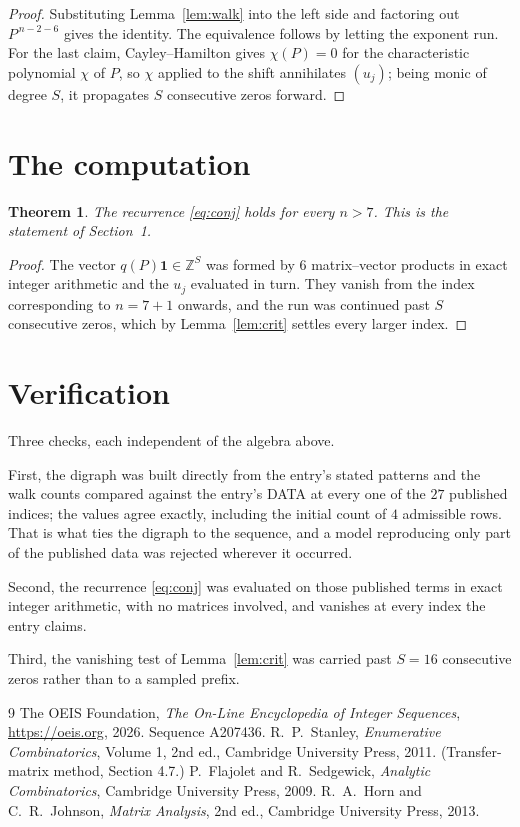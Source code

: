 \documentclass[11pt,a4paper]{article}
\theoremstyle{plain}
\newtheorem{theorem}{Theorem}
\theoremstyle{definition}
\begin{document}
\begin{proof}
Substituting Lemma~\ref{lem:walk} into the left side and factoring out
$P^{\,n-2-6}$ gives the identity. The equivalence follows by letting the exponent
run. For the last claim, Cayley--Hamilton gives $\chi(P)=0$ for the characteristic
polynomial $\chi$ of $P$, so $\chi$ applied to the shift annihilates $(u_j)$; being monic of
degree $S$, it propagates $S$ consecutive zeros forward.
\end{proof}

\section{The computation}

\begin{theorem}
The recurrence \eqref{eq:conj} holds for every $n>7$. This is the statement of
Section~1.
\end{theorem}

\begin{proof}
The vector $q(P)\mathbf{1}\in\mathbb{Z}^{S}$ was formed by $6$ matrix--vector
products in exact integer arithmetic and the $u_j$ evaluated in turn. They vanish from the
index corresponding to $n=7+1$ onwards, and the run was continued past $S$ consecutive
zeros, which by Lemma~\ref{lem:crit} settles every larger index.
\end{proof}

\section{Verification}

Three checks, each independent of the algebra above.

First, the digraph was built directly from the entry's stated patterns and the walk counts
compared against the entry's DATA at every one of the $27$ published indices; the
values agree exactly, including the initial count of $4$ admissible rows. That is
what ties the digraph to the sequence, and a model reproducing only part of the published
data was rejected wherever it occurred.

Second, the recurrence \eqref{eq:conj} was evaluated on those published terms in exact
integer arithmetic, with no matrices involved, and vanishes at every index the entry claims.

Third, the vanishing test of Lemma~\ref{lem:crit} was carried past $S=16$ consecutive
zeros rather than to a sampled prefix.

\begin{thebibliography}{9}
 The OEIS Foundation, \emph{The On-Line Encyclopedia of Integer
Sequences}, \url{https://oeis.org}, 2026. Sequence A207436.
 R.~P.~Stanley, \emph{Enumerative Combinatorics}, Volume 1, 2nd ed.,
Cambridge University Press, 2011. (Transfer-matrix method, Section 4.7.)
 P.~Flajolet and R.~Sedgewick, \emph{Analytic Combinatorics}, Cambridge
University Press, 2009.
 R.~A.~Horn and C.~R.~Johnson, \emph{Matrix Analysis}, 2nd ed., Cambridge
University Press, 2013.
\end{thebibliography}
\end{document}
